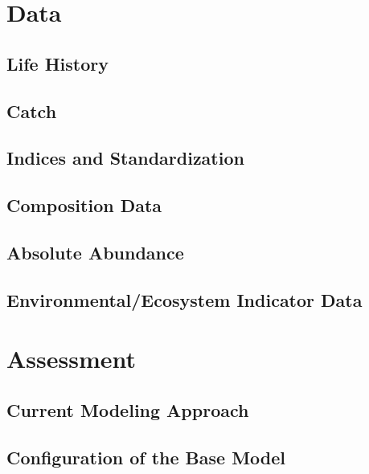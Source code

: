 \documentclass[
]{scrartcl}
\begin{document}
\newpage{}

\section{Data}\label{sec-data}

\subsection{Life History}\label{life-history}

\subsection{Catch}\label{catch}

\subsection{Indices and
Standardization}\label{indices-and-standardization}

\subsection{Composition Data}\label{composition-data}

\subsection{Absolute Abundance}\label{absolute-abundance}

\subsection{Environmental/Ecosystem Indicator
Data}\label{environmentalecosystem-indicator-data}

\newpage{}

\section{Assessment}\label{sec-assmt-config}

\subsection{Current Modeling Approach}\label{current-modeling-approach}

\subsection{Configuration of the Base
Model}\label{configuration-of-the-base-model}
\end{document}
